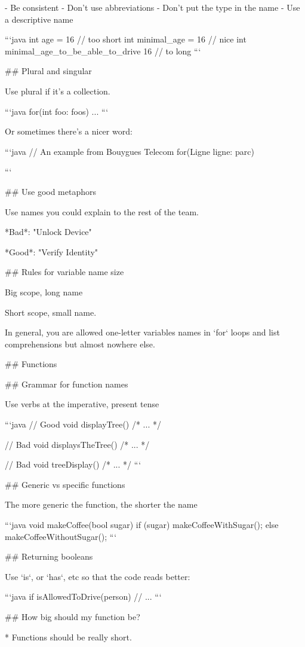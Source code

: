 - Be consistent
- Don't use abbreviations
- Don't put the type in the name
- Use a descriptive name

```java
int age = 16  // too short
int minimal_age = 16 // nice
int minimal_age_to_be_able_to_drive  16  // to long
```

## Plural and singular

Use plural if it's a collection.

```java
for(int foo: foos) {
    ...
}
```

Or sometimes there's a nicer word:

```java
// An example from Bouygues Telecom
for(Ligne ligne: parc) {

}
```

## Use good metaphors

Use names you could explain to the rest of the team.

*Bad*: "Unlock Device"

*Good*: "Verify Identity"


## Rules for variable name size

Big scope, long name

Short scope, small name.

In general, you are allowed one-letter variables names in `for` loops
and list comprehensions but almost nowhere else.


##  Functions


## Grammar for function names

Use verbs at the imperative, present tense

```java
// Good
void displayTree() { /* ... */ }

// Bad
void displaysTheTree() { /* ... */ }

// Bad
void treeDisplay() { /* ... */ }
```

## Generic vs specific functions

The more generic the function, the shorter the name

```java
void makeCoffee(bool sugar) {
    if (sugar) {
        makeCoffeeWithSugar();
    }
    else {
        makeCoffeeWithoutSugar();
    }
}
```

## Returning booleans

Use `is`, or `has`, etc so that the code reads better:

```java
if isAllowedToDrive(person) {
   // ...
}
```


## How big should my function be?

* Functions should be really short.

